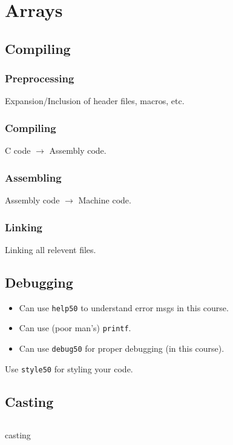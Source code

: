\chapter{Arrays}
\section{Compiling}
\subsection{Preprocessing}
Expansion/Inclusion of header files, macros, etc.

\subsection{Compiling}
C code $\to$ Assembly code.

\subsection{Assembling}
Assembly code $\to$ Machine code.

\subsection{Linking}
Linking all relevent files.

\section{Debugging}
\begin{itemize}
    \item Can use \texttt{help50} to understand error msgs in this course.
    \item Can use (poor man's) \texttt{printf}.
    \item Can use \texttt{debug50} for proper debugging (in this course).
\end{itemize}

\begin{remark}
    Use \texttt{style50} for styling your code.
\end{remark}

\section{Casting}
\begin{listing}[ht!]
    \inputminted[linenos]{c}{codes/src2/hi.c}
    \caption{casting}
\end{listing}

